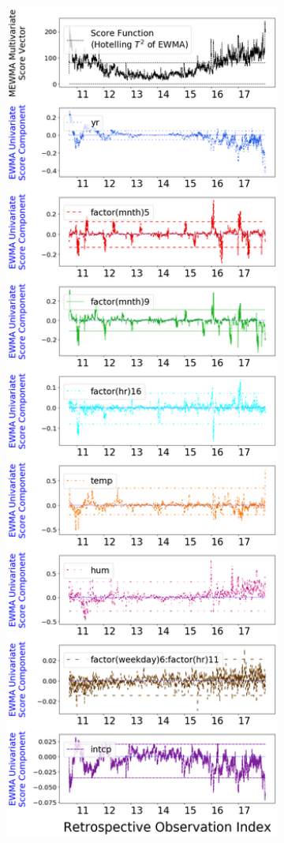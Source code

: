 \documentclass[twoside,11pt]{article}
\begin{document}
\begin{figure}[H]
\begin{subfigure}[t]{0.35\linewidth}
     \captionsetup{width=.95\linewidth}
     \caption{}
     \label{fig:bs_retro}
\end{subfigure}
\begin{subfigure}[t]{0.35\linewidth}
     \centering
         \includegraphics[width=1.0\textwidth, trim=.0in .0in .0in .0in, clip]{../figures/v14/bike_sharing/reg_lin_B_1/quadr/PII_pos_single_retro_bike_fisher_mlines_with_regu_1e-08_0_0001_0_01_99_99.png}

\end{subfigure}
\end{figure}
\end{document}
